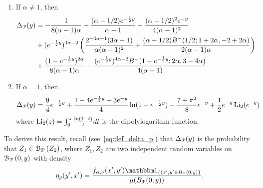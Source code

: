\begin{proposition}\label{prop:full_expression_delta_P}
\begin{enumerate}
	\item If $\alpha \not = 1$, then
	\begin{align*}
	 \Delta_{{\mathcal P}}(y) &=-\frac{1}{8 (\alpha - 1) \alpha} + \frac{(\alpha - 1/2) e^{-\frac{1}{2}y}}{\alpha - 1} - \frac{(\alpha - 1/2)^2 e^{-y}}{
		4 (\alpha - 1)^2} \\
	&+ 
	(e^{-\frac{1}{2}y})^{4\alpha -2} \left(\frac{2^{-4 \alpha-1} (3 \alpha - 1)}{\alpha (\alpha - 1)^2} + \frac{(\alpha - 
		1/2 ) B^-(1/2; 1 + 2 \alpha, 
		-2 + 2 \alpha)}{2(\alpha - 1) \alpha} \right) \\
	&+ \frac{(1 - 
		e^{-\frac{1}{2}y})^{2 \alpha}}{8 (\alpha - 1) \alpha} - \frac{  
		(e^{-\frac{1}{2}y})^{4 \alpha - 2} B^-(1 - e^{-\frac{1}{2}y}; 2 \alpha, 3 - 4 \alpha)}{4 (\alpha - 1)}
	\end{align*}
	\item If $\alpha = 1$, then
	\begin{align*}
	&\Delta_{{\mathcal P}}(y) =\frac{9}{4} e^{-\frac{1}{2}y} + \frac{1 - 4 e^{-\frac{1}{2}y} + 3 e^{-y}}{4}\ln(1 - e^{-\frac{1}{2}y}) - \frac{7+\pi^2}{8}
e^{-y}  + 
\frac{1}{2}e^{-y}\operatorname{Li}_2(e^{-y})
	\end{align*}
	where $\operatorname{Li}_2(z)=\int_0^z \frac{\ln(1-t)}{t}dt$ is the dipolylogarithm function.
\end{enumerate}
\end{proposition}



To derive this result, recall (see~\eqref{eq:def_delta_p}) that $\Delta_{{\mathcal P}}(y)$ is the probability that $Z_1 \in {\mathcal B}_{{\mathcal P}}\left(Z_2\right)$, where $Z_1, Z_2$ are two independent random variables on ${\mathcal B}_{{\mathcal P}}\left(0,y\right)$ with density 
\[
	\eta_{y}(y^\prime,x^\prime) = \frac{f_{\alpha,\nu}(x^\prime, y^\prime)\ind{(x^\prime, y^\prime \in B_{\Pcal}(0,y)}}{\mu(B_{\Pcal}(0,y))}.
\]

